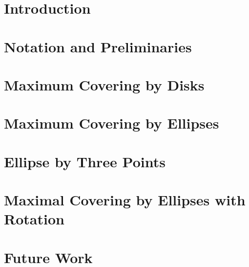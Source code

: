 \documentclass[mestrado]{packages/icmc}
\begin{document}
\textual

\chapter{Introduction}
\label{chapter:introduction}


\chapter{Notation and Preliminaries}
\label{chapter:definitions}


\chapter{Maximum Covering by Disks}
\label{chapter:pmclp}


\chapter{Maximum Covering by Ellipses}
\label{chapter:ellipses}


\chapter{Ellipse by Three Points}
\label{chapter:e3p}


\chapter{Maximal Covering by Ellipses with Rotation}
\label{chapter:ellipses_n}


\chapter{Future Work}
\label{chapter:future_work}


%

%
\end{document}
